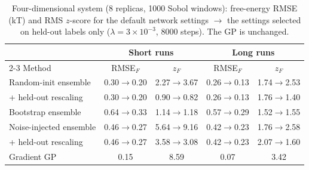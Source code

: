 \begin{table}
\caption{Four-dimensional system (8 replicas, 1000 Sobol windows): free-energy RMSE (kT) and RMS $z$-score for the
default network settings $\to$ the settings selected on held-out labels only ($\lambda=3\times10^{-3}$, 8000 steps).
The GP is unchanged.}
\label{tab:4d}
\begin{ruledtabular}
\begin{tabular}{lcccc}
 & \multicolumn{2}{c}{Short runs} & \multicolumn{2}{c}{Long runs} \\
\cline{2-3}\cline{4-5}
Method & RMSE$_F$ & $z_F$ & RMSE$_F$ & $z_F$ \\
\hline
Random-init ensemble & 0.30$\to$0.20 & 2.27$\to$3.67 & 0.26$\to$0.13 & 1.74$\to$2.53 \\
\quad + held-out rescaling & 0.30$\to$0.20 & 0.90$\to$0.82 & 0.26$\to$0.13 & 1.76$\to$1.40 \\
Bootstrap ensemble & 0.64$\to$0.33 & 1.14$\to$1.18 & 0.57$\to$0.29 & 1.52$\to$1.55 \\
Noise-injected ensemble & 0.46$\to$0.27 & 5.64$\to$9.16 & 0.42$\to$0.23 & 1.76$\to$2.58 \\
\quad + held-out rescaling & 0.46$\to$0.27 & 3.58$\to$3.08 & 0.42$\to$0.23 & 2.07$\to$1.60 \\
Gradient GP & 0.15 & 8.59 & 0.07 & 3.42 \\
\end{tabular}
\end{ruledtabular}
\end{table}
